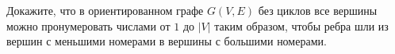Докажите, что в ориентированном графе $G(V, E)$ без циклов все вершины можно пронумеровать числами от $1$
до $|V|$ таким образом, чтобы ребра шли из вершин с меньшими номерами в вершины с большими номерами.
